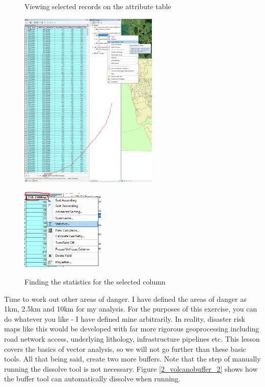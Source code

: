 \documentclass{article}
\begin{document}
\begin{figure}[h]
  \centering
  \begin{minipage}[b]{0.5\textwidth}
    \centering
    \caption{Viewing selected records on the attribute table}
    \includegraphics[width=250px]{images/part2/viewattributetable.PNG}
    \label{2_viewattributetable}
  \end{minipage}
  \hfill
  \begin{minipage}[b]{0.4\textwidth}
    \centering
    \caption{Finding the statistics for the selected column}
    \includegraphics[width=150px]{images/part2/viewattribute_statistics.PNG}
    \label{2_viewattribute_statistics}
  \end{minipage}
\end{figure}

Time to work out other areas of danger. I have defined the areas of danger as 1km, 2.5km and 10km for my analysis. For the purposes of this exercise, you can do whatever you like - I have defined mine arbitrarily. In reality, disaster risk maps like this would be developed with far more rigorous geoprocessing including road network access, underlying lithology, infrastructure pipelines etc. This lesson covers the basics of vector analysis, so we will not go further than these basic tools. All that being said, create two more buffers. Note that the step of manually running the dissolve tool is not necessary. Figure \ref{2_volcanobuffer_2} shows how the buffer tool can automatically dissolve when running.
\pagebreak
\end{document}
